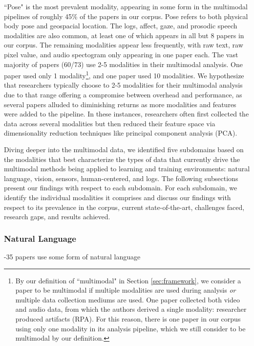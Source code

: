 \documentclass[manuscript,screen,review]{acmart}
\begin{document}
``Pose" is the most prevalent modality, appearing in some form in the multimodal pipelines of roughly 45\% of the papers in our corpus. Pose refers to both physical body pose and geospacial location. The logs, affect, gaze, and prosodic speech modalities are also common, at least one of which appears in all but 8 papers in our corpus. The remaining modalities appear less frequently, with raw text, raw pixel value, and audio spectogram only appearing in one paper each. The vast majority of papers (60/73) use 2-5 modalities in their multimodal analysis. One paper used only 1 modality\footnote{By our definition of ``multimodal" in Section \ref{sec:framework}, we consider a paper to be multimodal if multiple modalities are used during analysis \textit{or} multiple data collection mediums are used. One paper \cite{3809293172} collected both video and audio data, from which the authors derived a single modality: researcher produced artifacts (RPA). For this reason, there is one paper in our corpus using only one modality in its analysis pipeline, which we still consider to be multimodal by our definition.}, and one paper used 10 modalities. We hypothesize that researchers typically choose to 2-5 modalities for their multimodal analysis due to that range offering a compromise between overhead and performance, as several papers alluded to diminishing returns as more modalities and features were added to the pipeline. In these instances, researchers often first collected the data across several modalities but then reduced their feature space via dimensionality reduction techniques like principal component analysis (PCA). 

Diving deeper into the multimodal data, we identified five subdomains based on the modalities that best characterize the types of data that currently drive the multimodal methods being applied to learning and training environments: natural language, vision, sensors, human-centered, and logs. The following subsections present our findings with respect to each subdomain. For each subdomain, we identify the individual modalities it comprises and discuss our findings with respect to its prevalence in the corpus, current state-of-the-art, challenges faced, research gaps, and results achieved.

\subsubsection{Natural Language}
-35 papers use some form of natural language\\
\end{document}
